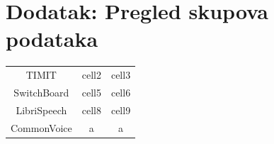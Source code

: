 \documentclass[a4paper]{article}
\begin{document}
\appendix
 
% 


\appendix

\section{Dodatak: Pregled skupova podataka}
\label{sec:skupovi}

\begin{table}[h!]
\begin{center}
  \begin{tabular}{|c|c|c|}
    \hline
    TIMIT & cell2 & cell3 \\ 
    SwitchBoard & cell5 & cell6 \\ 
    LibriSpeech & cell8 & cell9 \\ 
    CommonVoice & a & a \\
    \hline
  \end{tabular}
\end{center}
\end{table}
\end{document}
